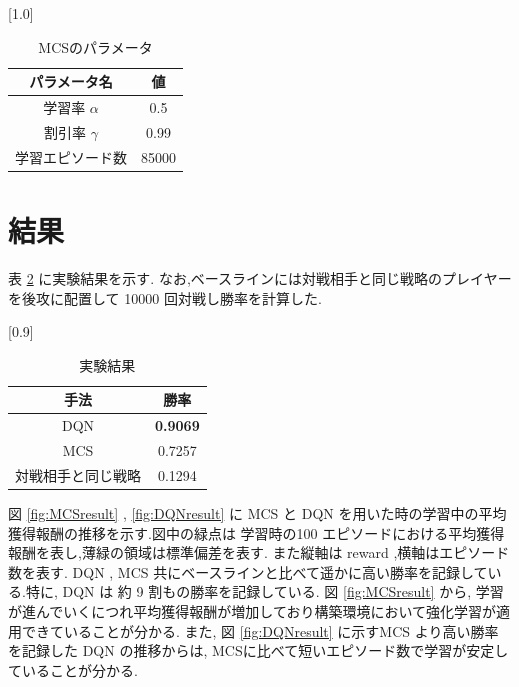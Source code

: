 \documentclass[twocolumn]{jarticle}
\begin{document}
    \begin{table}[t]
      \centering
      \caption{MCSのパラメータ}
      \vspace{-0.3cm}
      \label{table:mcsparam}
      \scalebox{1.0}[1.0]{
        \begin{tabular}{|c|c|}
          \hline
          パラメータ名 & 値 \\ \hline \hline
          学習率 $\alpha$ & 0.5 \\ \hline
          割引率 $\gamma$ & 0.99 \\ \hline     
          学習エピソード数 & 85000 \\ \hline
    
          \end{tabular}
      }
      \end{table}


\section{結果}
表 \ref{table:result} に実験結果を示す. なお,ベースラインには対戦相手と同じ戦略のプレイヤーを後攻に配置して 10000 回対戦し勝率を計算した.
\begin{table}[t]
  \centering
  \caption{実験結果}
  \vspace{-0.3cm}
  \label{table:result}
  \scalebox{0.9}[0.9]{
    \begin{tabular}{|c|c|}
      \hline
      手法 & 勝率 \\ \hline \hline
      DQN & \textbf{0.9069} \\ \hline
      MCS & 0.7257 \\ \hline     
      対戦相手と同じ戦略 & 0.1294 \\ \hline

      \end{tabular}
  }
  \end{table}

  図 \ref{fig:MCSresult} , \ref{fig:DQNresult} に MCS と DQN を用いた時の学習中の平均獲得報酬の推移を示す.図中の緑点は 学習時の100 エピソードにおける平均獲得報酬を表し,薄緑の領域は標準偏差を表す.
  また縦軸は reward ,横軸はエピソード数を表す. 
  DQN , MCS 共にベースラインと比べて遥かに高い勝率を記録している.特に, DQN は 約 9 割もの勝率を記録している.
図 \ref{fig:MCSresult} から, 学習が進んでいくにつれ平均獲得報酬が増加しており構築環境において強化学習が適用できていることが分かる.
また, 図 \ref{fig:DQNresult} に示すMCS より高い勝率を記録した DQN の推移からは, MCSに比べて短いエピソード数で学習が安定していることが分かる.
\end{document}
